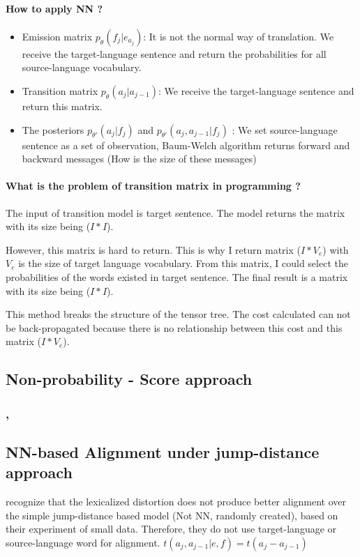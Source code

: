 \documentclass{article}
\begin{document}
\paragraph{How to apply NN ?}
\begin{itemize}
\item Emission matrix $p_{\theta}(f_j | e_{a_j})$: It is not the normal way of translation. We receive the target-language sentence and return the probabilities for all source-language vocabulary.
\item Transition matrix $p_{\theta}(a_j | a_{j-1})$: We receive the target-language sentence and return this matrix.

\item The posteriors $p_{\theta'}(a_j|f_j)$ and $p_{\theta'}(a_j, a_{j-1}|f_j)$ : We set source-language sentence as a set of observation, Baum-Welch algorithm returns forward and backward messages (How is the size of these messages)
\end{itemize}

\paragraph{What is the problem of transition matrix in programming ?}
The input of transition model is target sentence. The model returns the matrix with its size being ($I * I$). 

However, this matrix is hard to return. This is why I return matrix ($I * V_e$) with $V_e$ is the size of target language vocabulary. From this matrix, I could select the probabilities of the words existed in target sentence. The final result is a matrix with its size being ($I * I$).

This method breaks the structure of the tensor tree. The cost calculated can not be back-propagated because there is no relationship between this cost and this matrix ($I * V_e$).

\subsection{Non-probability - Score approach}
\subsubsection{\cite{Yang13word}, \cite{Tamura14recurrent}}

\subsection{NN-based Alignment under jump-distance approach}
\cite{Yang13word} recognize that the lexicalized distortion does not produce better alignment over the simple jump-distance based model (Not NN, randomly created), based on their experiment of small data. Therefore, they do not use target-language or source-language word for alignment. $t(a_{j}, a_{j-1}|e,f) = t(a_{j} - a_{j-1})$\\
\end{document}
